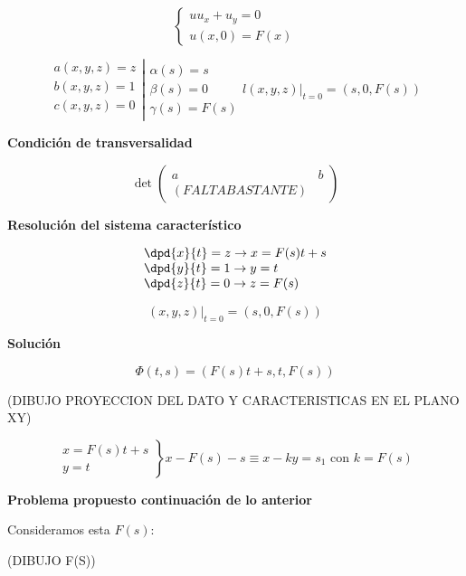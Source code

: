 	\begin{example}{1}
		\[\left\{ \begin{array}{l} uu_x + u_y = 0 \\ u(x,0) = F(x) \end{array}\right.\]

		\[ \left.\begin{array}{r}
		a(x,y,z) = z \\
		b(x,y,z) = 1 \\
		c(x,y,z) = 0 \\
		\end{array} \right| \begin{array}{l}
		\alpha(s) = s \\
		\beta(s) = 0 \\
		\gamma(s) = F(s) \end{array}{l}
		(x,y,z)|_{t=0} = (s,0,F(s))
		\]

		\textbf{Condición de transversalidad}

		\[\det \begin{pmatrix}
		a & b \\
		(FALTA BASTANTE)
		\end{pmatrix} \]

		\textbf{Resolución del sistema característico}

		\[ \begin{array}{l}
		\dpd{x}{t} = z \rightarrow x = F(s) t + s \\
		\dpd{y}{t} = 1 \rightarrow y = t \\
		\dpd{z}{t} = 0 \rightarrow z = F(s)
		\end{array} \]

		\[(x,y,z) |_{t=0} = (s,0,F(s)) \]

		\textbf{Solución}

		\[\Phi(t,s) = (F(s)t+s,t,F(s))\]


		(DIBUJO PROYECCION DEL DATO Y CARACTERISTICAS EN EL PLANO XY)

		\[
		\left.
\begin{array}{r}
x = F(s)t + s \\
y = t
\end{array}
\right\} x - F(s) -s \equiv x - ky = s_1 \text{ con } k = F(s)
		\]

	\end{example}

	\textbf{Problema propuesto continuación de lo anterior}

	Consideramos esta $F(s)$:

	(DIBUJO F(S))

